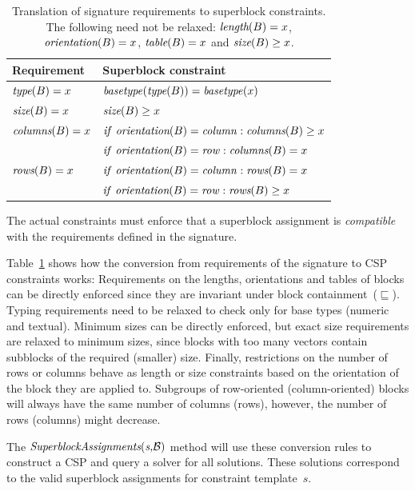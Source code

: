 \begin{table}[t]
  \caption{Translation of signature requirements to superblock constraints. The following need not be relaxed: $\textit{length}(B) = x$, $\textit{orientation}(B) = x$, $\textit{table}(B) = x$ and $\textit{size}(B) \geq x$.}
  \label{tbl:translation}
  \begin{tabularx}{\linewidth}{lX}
    \textbf{Requirement} & \textbf{Superblock constraint} \\ \hline \hline
    $\textit{type}(B) = x$ & $\mathit{basetype}(\textit{type}(B)) = \mathit{basetype}(x)$ \\ \hline
    $\textit{size}(B) = x$ & $\textit{size}(B) \geq x$ \\ \hline
    $\textit{columns}(B) = x$ & $\mathit{if}~\textit{orientation}(B) = \mathit{column}: \textit{columns}(B) \geq x$ \\ 
    & $\mathit{if}~\textit{orientation}(B) = \mathit{row}: \textit{columns}(B) = x$ \\ \hline
    $\textit{rows}(B) = x$ & $\mathit{if}~\textit{orientation}(B) = \mathit{column}: \textit{rows}(B) = x$ \\ 
    & $\mathit{if}~\textit{orientation}(B) = \mathit{row}: \textit{rows}(B) \geq x$
  \end{tabularx}
\end{table}

The actual constraints must enforce that a superblock assignment is \textit{compatible} with the requirements defined in the signature.

Table~\ref{tbl:translation} shows how the conversion from requirements of the signature to CSP constraints works:
Requirements on the lengths, orientations and tables of blocks can be directly enforced since they are invariant under block containment~($\sqsubseteq$).
Typing requirements need to be relaxed to check only for base types (numeric and textual).
Minimum sizes can be directly enforced, but exact size requirements are relaxed to minimum sizes, since blocks with too many vectors contain subblocks of the required (smaller) size.
Finally, restrictions on the number of rows or columns behave as length or size constraints based on the orientation of the block they are applied to.
Subgroups of row-oriented (column-oriented) blocks will always have the same number of columns (rows), however, the number of rows (columns) might decrease.

The $\textit{SuperblockAssignments}(\textit{s,\ensuremath{\mathcal{B}}})$ method will use these conversion rules to construct a CSP and query a solver for all solutions.
These solutions correspond to the valid superblock assignments for constraint template~$s$.


